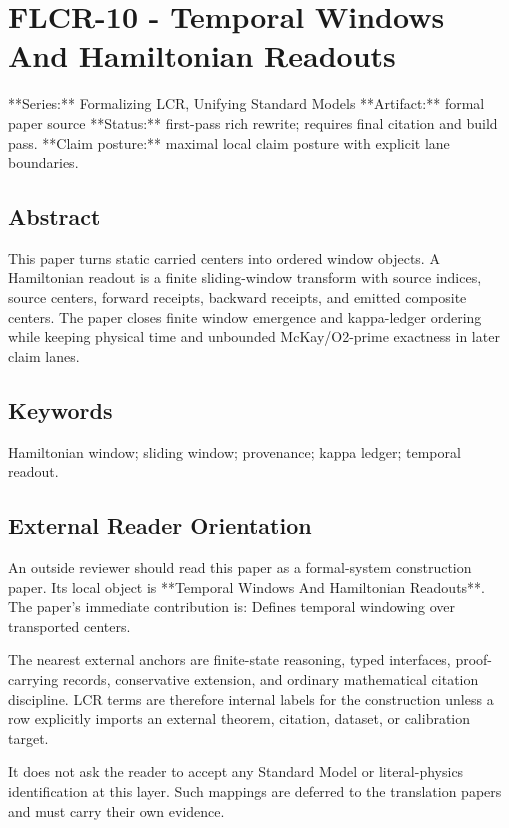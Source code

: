 \documentclass[11pt]{article}
\begin{document}
\section*{FLCR-10 - Temporal Windows And Hamiltonian Readouts}

**Series:** Formalizing LCR, Unifying Standard Models
**Artifact:** formal paper source
**Status:** first-pass rich rewrite; requires final citation and build pass.
**Claim posture:** maximal local claim posture with explicit lane boundaries.

\subsection*{Abstract}

This paper turns static carried centers into ordered window objects. A Hamiltonian readout is a finite sliding-window transform with source indices, source centers, forward receipts, backward receipts, and emitted composite centers. The paper closes finite window emergence and kappa-ledger ordering while keeping physical time and unbounded McKay/O2-prime exactness in later claim lanes.

\subsection*{Keywords}

Hamiltonian window; sliding window; provenance; kappa ledger; temporal readout.

\subsection*{External Reader Orientation}

An outside reviewer should read this paper as a formal-system construction paper. Its local object is **Temporal Windows And Hamiltonian Readouts**. The paper's immediate contribution is: Defines temporal windowing over transported centers.

The nearest external anchors are finite-state reasoning, typed interfaces, proof-carrying records, conservative extension, and ordinary mathematical citation discipline. LCR terms are therefore internal labels for the construction unless a row explicitly imports an external theorem, citation, dataset, or calibration target.

It does not ask the reader to accept any Standard Model or literal-physics identification at this layer. Such mappings are deferred to the translation papers and must carry their own evidence.
\end{document}
